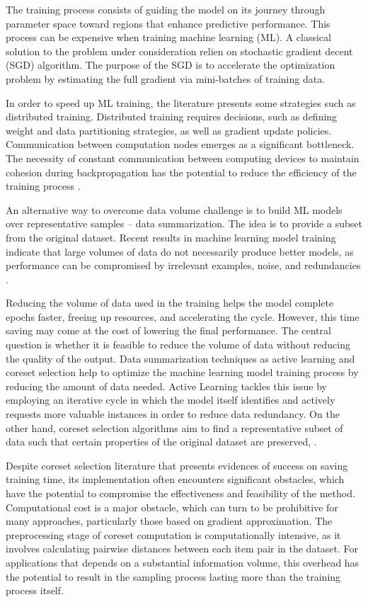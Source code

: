 \documentclass{article}
\begin{document}
The training process consists of guiding the model on its journey through parameter space toward regions that enhance predictive performance. This process can be expensive when training machine learning (ML). A classical solution to the problem under consideration relien on stochastic gradient decent (SGD) algorithm. The purpose of the SGD is to accelerate the optimization problem by estimating the full gradient via mini-batches of training data.

In order to speed up ML training, the literature presents some strategies such as distributed training. Distributed training requires decisions, such as defining weight and data partitioning strategies, as well as gradient update policies. Communication between computation nodes emerges as a significant bottleneck. The necessity of constant communication between computing devices to maintain cohesion during backpropagation has the potential to reduce the efficiency of the training process \cite{7239545, aaron2018pipedream}.

An alternative way to overcome data volume challenge is to build ML models over representative samples -- data summarization. The idea is to provide a subset from the original dataset. Recent results in machine learning model training indicate that large volumes of data do not necessarily produce better models, as performance can be compromised by irrelevant examples, noise, and redundancies \cite{Weinreich2025Survey}.

Reducing the volume of data used in the training helps the model complete epochs faster, freeing up resources, and accelerating the cycle. However, this time saving may come at the cost of lowering the final performance. The central question is whether it is feasible to reduce the volume of data without reducing the quality of the output. Data summarization techniques as active learning and coreset selection help to optimize the machine learning model training process by reducing the amount of data needed. Active Learning tackles this issue by employing an iterative cycle in which the model itself identifies and actively requests more valuable instances in order to reduce data redundancy. On the other hand, coreset selection algorithms aim to find a representative subset of data such that certain properties of the original dataset are preserved, \cite{Huggins2016, Chai2023GoodCore, Wang2025DataWhisperer, Mirzasoleiman2020Coresets}.

Despite coreset selection literature that presents evidences of success on saving training time, its implementation often  encounters significant obstacles, which have the potential to compromise the effectiveness and feasibility of the method. Computational cost is a major obstacle, which can turn to be prohibitive for many approaches, particularly those based on gradient approximation. The preprocessing stage of coreset computation is computationally intensive, as it involves calculating pairwise distances between  each item pair in the dataset. For applications that depends on a substantial information volume, this overhead has the potential to result in the sampling process lasting more than the training process itself.
\end{document}
